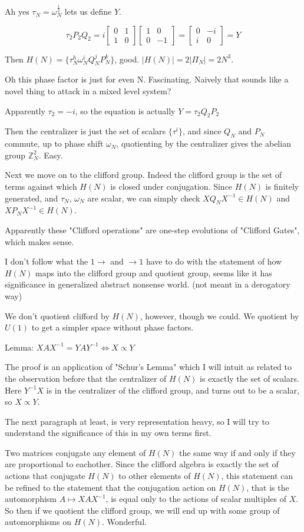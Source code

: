 \documentclass[]{article}
\newcommand{\ord}[1]{\left| #1 \right|}
\begin{document}
Ah yes $\tau_N = \omega_N^{\frac{1}{2}}$ lets us define $Y$.

\[\tau_2P_2Q_2 = i
\left[\begin{matrix}
0 & 1 \\
1 & 0
\end{matrix}\right]
\left[\begin{matrix}
1 & 0 \\
0 & -1
\end{matrix}\right]
=
\left[\begin{matrix}
	0 & -i \\
	i & 0
\end{matrix}\right]
= Y\]

Then $H(N) = \{\tau_N^h\omega_N^i Q_N^j P_N^k\}$, good. $\ord{H(N)}=2\ord{\Pi_N}=2N^3$.

Oh this phase factor is just for even N. Fascinating. Naively that sounds like a novel thing to attack in a mixed level system?

Apparently $\tau_2 = -i$, so the equation is actually $Y = \tau_2 Q_2 P_2$

Then the centralizer is just the set of scalars $\{\tau^i\}$, and since $Q_N$ and $P_N$ commute, up to phase shift $\omega_N$, quotienting by the centralizer gives the abelian group $\mathbb{Z}_N^2$. Easy.

Next we move on to the clifford group.
Indeed the clifford group is the set of terms against which $H(N)$ is closed under conjugation. Since $H(N)$ is finitely generated, and $\tau_N$, $\omega_N$ are scalar, we can simply check $XQ_NX^{-1} \in H(N)$ and $XP_NX^{-1} \in H(N)$.

Apparently these "Clifford operations" are one-step evolutions of "Clifford Gates", which makes sense.

I don't follow what the $1 \to$ and $\to 1$ have to do with the statement of how $H(N)$ maps into the clifford group and quotient group, seems like it has significance in generalized abstract nonsense world. (not meant in a derogatory way)

We don't quotient clifford by $H(N)$, however, though we could. We quotient by $U(1)$ to get a simpler space without phase factors.

Lemma: $XAX^{-1} = YAY^{-1} \iff X \propto Y$

The proof is an application of "Schur's Lemma" which I will intuit as related to the observation before that the centralizer of $H(N)$ is exactly the set of scalars. Here $Y^{-1}X$ is in the centralizer of the clifford group, and turns out to be a scalar, so $X \propto Y$.

The next paragraph at least, is very representation heavy, so I will try to understand the significance of this in my own terms first.

Two matrices conjugate any element of $H(N)$ the same way if and only if they are proportional to eachother. Since the clifford algebra is exactly the set of actions that conjugate $H(N)$ to other elements of $H(N)$, this statement can be refined to the statement that the conjugation action on $H(N)$, that is the automorphism $A \mapsto XAX^{-1}$, is equal only to the actions of scalar multiples of $X$. So then if we quotient the clifford group, we will end up with some group of automorphisms on $H(N)$. Wonderful.
\end{document}
